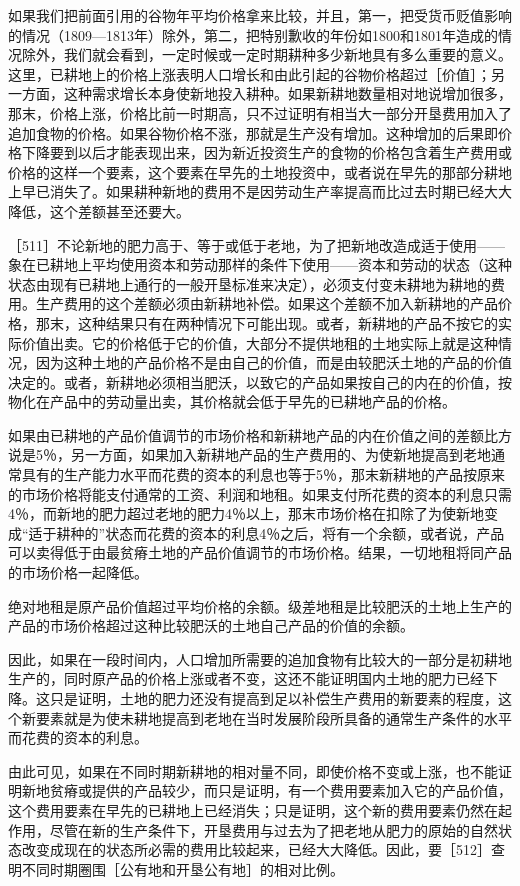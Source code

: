 如果我们把前面引用的谷物年平均价格拿来比较，并且，第一，把受货币贬值影响的情况（1809—1813年）除外，第二，把特别歉收的年份如1800和1801年造成的情况除外，我们就会看到，一定时候或一定时期耕种多少新地具有多么重要的意义。这里，已耕地上的价格上涨表明人口增长和由此引起的谷物价格超过［价值］；另一方面，这种需求增长本身使新地投入耕种。如果新耕地数量相对地说增加很多，那末，价格上涨，价格比前一时期高，只不过证明有相当大一部分开垦费用加入了追加食物的价格。如果谷物价格不涨，那就是生产没有增加。这种增加的后果即价格下降要到以后才能表现出来，因为新近投资生产的食物的价格包含着生产费用或价格的这样一个要素，这个要素在早先的土地投资中，或者说在早先的那部分耕地上早已消失了。如果耕种新地的费用不是因劳动生产率提高而比过去时期已经大大降低，这个差额甚至还要大。

［511］不论新地的肥力高于、等于或低于老地，为了把新地改造成适于使用——象在已耕地上平均使用资本和劳动那样的条件下使用——资本和劳动的状态（这种状态由现有已耕地上通行的一般开垦标准来决定），必须支付变未耕地为耕地的费用。生产费用的这个差额必须由新耕地补偿。如果这个差额不加入新耕地的产品价格，那末，这种结果只有在两种情况下可能出现。或者，新耕地的产品不按它的实际价值出卖。它的价格低于它的价值，大部分不提供地租的土地实际上就是这种情况，因为这种土地的产品价格不是由自己的价值，而是由较肥沃土地的产品的价值决定的。或者，新耕地必须相当肥沃，以致它的产品如果按自己的内在的价值，按物化在产品中的劳动量出卖，其价格就会低于早先的已耕地产品的价格。

如果由已耕地的产品价值调节的市场价格和新耕地产品的内在价值之间的差额比方说是5％，另一方面，如果加入新耕地产品的生产费用的、为使新地提高到老地通常具有的生产能力水平而花费的资本的利息也等于5％，那末新耕地的产品按原来的市场价格将能支付通常的工资、利润和地租。如果支付所花费的资本的利息只需4％，而新地的肥力超过老地的肥力4％以上，那末市场价格在扣除了为使新地变成“适于耕种的”状态而花费的资本的利息4％之后，将有一个余额，或者说，产品可以卖得低于由最贫瘠土地的产品价值调节的市场价格。结果，一切地租将同产品的市场价格一起降低。

绝对地租是原产品价值超过平均价格的余额。级差地租是比较肥沃的土地上生产的产品的市场价格超过这种比较肥沃的土地自己产品的价值的余额。

因此，如果在一段时间内，人口增加所需要的追加食物有比较大的一部分是初耕地生产的，同时原产品的价格上涨或者不变，这还不能证明国内土地的肥力已经下降。这只是证明，土地的肥力还没有提高到足以补偿生产费用的新要素的程度，这个新要素就是为使未耕地提高到老地在当时发展阶段所具备的通常生产条件的水平而花费的资本的利息。

由此可见，如果在不同时期新耕地的相对量不同，即使价格不变或上涨，也不能证明新地贫瘠或提供的产品较少，而只是证明，有一个费用要素加入它的产品价值，这个费用要素在早先的已耕地上已经消失；只是证明，这个新的费用要素仍然在起作用，尽管在新的生产条件下，开垦费用与过去为了把老地从肥力的原始的自然状态改变成现在的状态所必需的费用比较起来，已经大大降低。因此，要［512］查明不同时期圈围［公有地和开垦公有地］的相对比例。

